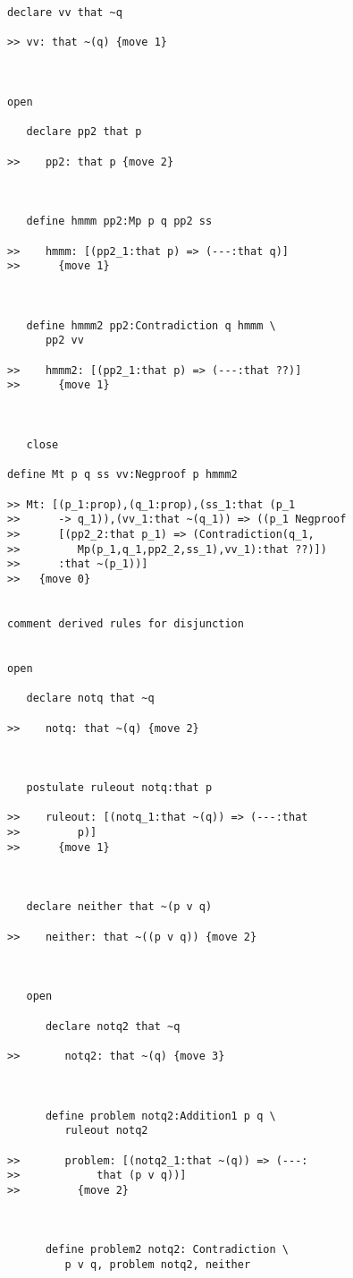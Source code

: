 \begin{verbatim}
declare vv that ~q

>> vv: that ~(q) {move 1}



open

   declare pp2 that p

>>    pp2: that p {move 2}



   define hmmm pp2:Mp p q pp2 ss

>>    hmmm: [(pp2_1:that p) => (---:that q)]
>>      {move 1}



   define hmmm2 pp2:Contradiction q hmmm \
      pp2 vv

>>    hmmm2: [(pp2_1:that p) => (---:that ??)]
>>      {move 1}



   close

define Mt p q ss vv:Negproof p hmmm2

>> Mt: [(p_1:prop),(q_1:prop),(ss_1:that (p_1
>>      -> q_1)),(vv_1:that ~(q_1)) => ((p_1 Negproof
>>      [(pp2_2:that p_1) => (Contradiction(q_1,
>>         Mp(p_1,q_1,pp2_2,ss_1),vv_1):that ??)])
>>      :that ~(p_1))]
>>   {move 0}


comment derived rules for disjunction


open

   declare notq that ~q

>>    notq: that ~(q) {move 2}



   postulate ruleout notq:that p

>>    ruleout: [(notq_1:that ~(q)) => (---:that
>>         p)]
>>      {move 1}



   declare neither that ~(p v q)

>>    neither: that ~((p v q)) {move 2}



   open

      declare notq2 that ~q

>>       notq2: that ~(q) {move 3}



      define problem notq2:Addition1 p q \
         ruleout notq2

>>       problem: [(notq2_1:that ~(q)) => (---:
>>            that (p v q))]
>>         {move 2}



      define problem2 notq2: Contradiction \
         p v q, problem notq2, neither


\end{verbatim}
